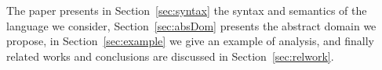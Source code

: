 The paper presents in Section~\ref{sec:syntax} the syntax and semantics of the language we consider, Section~\ref{sec:absDom} presents the abstract domain we propose, in Section~\ref{sec:example} we give an example of analysis, and finally related works and conclusions are discussed in Section~\ref{sec:relwork}. 


% 
